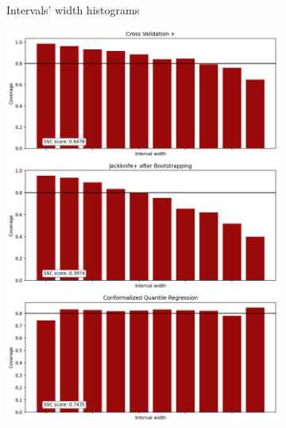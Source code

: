 \begin{figure}[ht]
\begin{subfigure}[b]{0.32\textwidth}
        \caption{Intervals' width histograms}
        \label{subfig:regression-width-histograms}
    \end{subfigure}
    \hfill
    \begin{subfigure}[b]{0.32\textwidth}
        \centering
        \includegraphics[width=1.15\textwidth, height=2.05\textwidth]{Figures/regression/coverage-vs-width-regression-problem.png}

\end{subfigure}
\end{figure}
